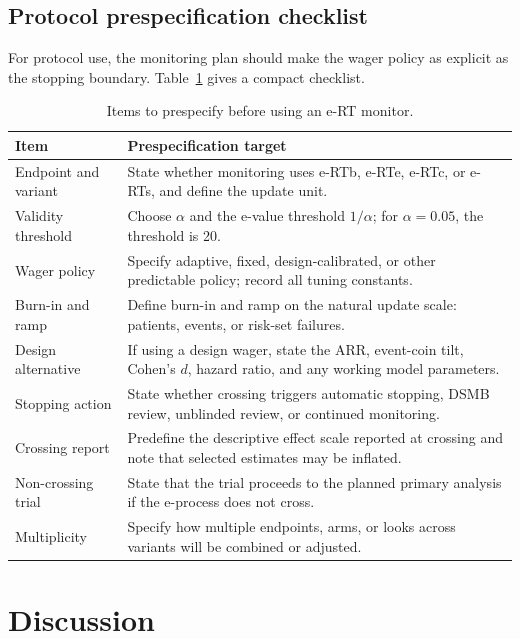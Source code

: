 \documentclass[10pt]{article}
\begin{document}


\subsection{Protocol prespecification checklist}

For protocol use, the monitoring plan should make the wager policy as explicit as the stopping boundary. Table~\ref{tab:prespec_checklist} gives a compact checklist.

\begin{table}[htbp]
\centering
\small
\caption{Items to prespecify before using an e-RT monitor.}
\label{tab:prespec_checklist}
\begin{tabular}{p{}p{}}
\toprule
Item & Prespecification target \\
\midrule
Endpoint and variant & State whether monitoring uses e-RTb, e-RTe, e-RTc, or e-RTs, and define the update unit. \\
Validity threshold & Choose $\alpha$ and the e-value threshold $1/\alpha$; for $\alpha=0.05$, the threshold is 20. \\
Wager policy & Specify adaptive, fixed, design-calibrated, or other predictable policy; record all tuning constants. \\
Burn-in and ramp & Define burn-in and ramp on the natural update scale: patients, events, or risk-set failures. \\
Design alternative & If using a design wager, state the ARR, event-coin tilt, Cohen's $d$, hazard ratio, and any working model parameters. \\
Stopping action & State whether crossing triggers automatic stopping, DSMB review, unblinded review, or continued monitoring. \\
Crossing report & Predefine the descriptive effect scale reported at crossing and note that selected estimates may be inflated. \\
Non-crossing trial & State that the trial proceeds to the planned primary analysis if the e-process does not cross. \\
Multiplicity & Specify how multiple endpoints, arms, or looks across variants will be combined or adjusted. \\
\bottomrule
\end{tabular}
\end{table}

\section{Discussion}
\end{document}
